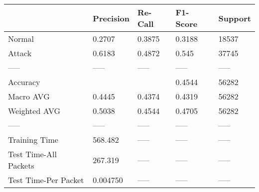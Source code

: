 \begin{tabular}{lllll}
\toprule
{} & Precision & Re-Call & F1-Score & Support \\
\midrule
Normal                &    0.2707 &  0.3875 &   0.3188 &   18537 \\
Attack                &    0.6183 &  0.4872 &    0.545 &   37745 \\
-----                 &     ----- &   ----- &    ----- &   ----- \\
Accuracy              &           &         &   0.4544 &   56282 \\
Macro AVG             &    0.4445 &  0.4374 &   0.4319 &   56282 \\
Weighted AVG          &    0.5038 &  0.4544 &   0.4705 &   56282 \\
-----                 &     ----- &   ----- &    ----- &   ----- \\
Training Time         &   568.482 &   ----- &    ----- &   ----- \\
Test Time-All Packets &   267.319 &   ----- &    ----- &   ----- \\
Test Time-Per Packet  &  0.004750 &   ----- &    ----- &   ----- \\
\bottomrule
\end{tabular}
